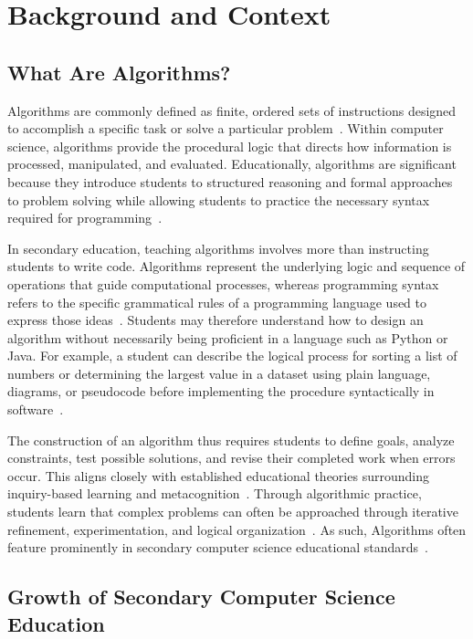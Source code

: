 % 
\section{Background and Context}
\subsection{What Are Algorithms?}
Algorithms are commonly defined as finite, ordered sets of instructions designed to accomplish a specific task or solve a particular problem~\cite{Voog2012,futschek2006algorithmic}.
Within computer science, algorithms provide the procedural logic that directs how information is processed, manipulated, and evaluated.
Educationally, algorithms are significant because they introduce students to structured reasoning and formal approaches to problem
  solving while allowing students to practice the necessary syntax required for programming~\cite{grover2017assessing,nijenhuis2023teaching}.

In secondary education, teaching algorithms involves more than instructing students to write code.
Algorithms represent the underlying logic and sequence of operations that guide computational processes, whereas programming syntax refers to the
  specific grammatical rules of a programming language used to express those ideas~\cite{csta2017}.
Students may therefore understand how to design an algorithm without necessarily being proficient in a language such as Python or Java.
For example, a student can describe the logical process for sorting a list of numbers or determining the largest value in a dataset using plain
  language, diagrams, or pseudocode before implementing the procedure syntactically in
  software~\cite{nijenhuis2023teaching,futschek2006algorithmic}.

The construction of an algorithm thus requires students to define goals, analyze constraints, test possible solutions, and revise their completed work when errors occur.
This aligns closely with established educational theories surrounding inquiry-based learning and metacognition~\cite{grover2017assessing}.
Through algorithmic practice, students learn that complex problems can often be approached through iterative refinement, experimentation, and logical
  organization~\cite{grover2017assessing}.
As such, Algorithms often feature prominently in secondary computer science educational standards~\cite{csta2017}.

\subsection{Growth of Secondary Computer Science Education}

